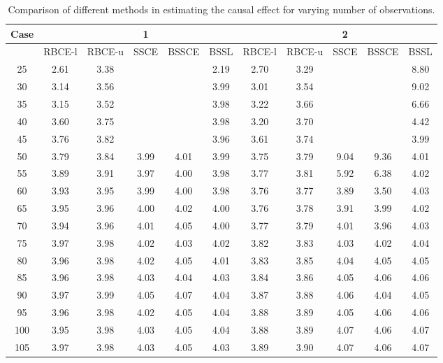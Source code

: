 \documentclass[preprint,12pt]{elsarticle}
\begin{document}
\begin{table}[ht]
\centering
\tiny
\caption{Comparison of different methods in estimating the causal effect for varying number of observations.}
\begin{tabular}{c|ccccc|ccccc}
  \hline
 Case&  &  & 1 &  &  &  &  & 2 &  &  \\ 
  \hline
 & RBCE-l & RBCE-u & SSCE & BSSCE & BSSL & RBCE-l & RBCE-u & SSCE & BSSCE & BSSL \\ 
  \hline
25 & 2.61 & 3.38 &  &  & 2.19 & 2.70 & 3.29 &  &  & 8.80 \\ 
  30 & 3.14 & 3.56 &  &  & 3.99 & 3.01 & 3.54 &  &  & 9.02 \\ 
  35 & 3.15 & 3.52 &  &  & 3.98 & 3.22 & 3.66 &  &  & 6.66 \\ 
  40 & 3.60 & 3.75 &  &  & 3.98 & 3.20 & 3.70 &  &  & 4.42 \\ 
  45 & 3.76 & 3.82 &  &  & 3.96 & 3.61 & 3.74 &  &  & 3.99 \\ 
  50 & 3.79 & 3.84 & 3.99 & 4.01 & 3.99 & 3.75 & 3.79 & 9.04 & 9.36 & 4.01  \\ 
  55 & 3.89 & 3.91 & 3.97 & 4.00 & 3.98 & 3.77 & 3.81 & 5.92 & 6.38 & 4.02 \\ 
  60 & 3.93 & 3.95 & 3.99 & 4.00 & 3.98 & 3.76 & 3.77 & 3.89 & 3.50 & 4.03 \\ 
  65 & 3.95 & 3.96 & 4.00 & 4.02 & 4.00 & 3.76 & 3.78 & 3.91 & 3.99 & 4.02 \\ 
  70 & 3.94 & 3.96 & 4.01 & 4.05 & 4.00 & 3.77 & 3.79 & 4.01 & 3.96 & 4.03 \\ 
  75 & 3.97 & 3.98 & 4.02 & 4.03 & 4.02  & 3.82 & 3.83 & 4.03 & 4.02 & 4.04 \\ 
  80 & 3.96 & 3.98 & 4.02 & 4.05 & 4.01 & 3.83 & 3.85 & 4.04 & 4.05 & 4.05 \\ 
  85 & 3.96 & 3.98 & 4.03 & 4.04 & 4.03 & 3.84 & 3.86 & 4.05 & 4.06 & 4.06 \\ 
  90 & 3.97 & 3.99 & 4.05 & 4.07 & 4.04 & 3.87 & 3.88 & 4.06 & 4.04 & 4.05 \\ 
  95 & 3.96 & 3.98 & 4.02 & 4.05 & 4.04 & 3.88 & 3.89 & 4.05 & 4.06 & 4.06 \\ 
  100 & 3.95 & 3.98 & 4.03 & 4.05 & 4.04 & 3.88 & 3.89 & 4.07 & 4.06 & 4.07 \\ 
  105 & 3.97 & 3.98 & 4.03 & 4.05 & 4.03 & 3.89 & 3.90 & 4.07 & 4.06 & 4.07 \\ 

\end{tabular}
\end{table}
\end{document}
